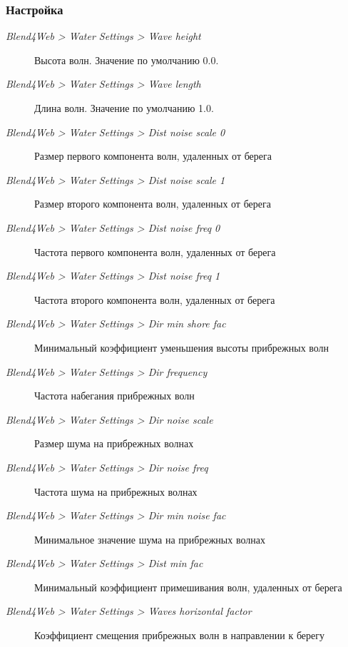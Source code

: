 \documentclass[a4paper,12pt,oneside]{sphinxmanual}
\begin{document}
\subsubsection{Настройка}
\label{outdoor_rendering:id22}\begin{description}
\item[{\emph{Blend4Web \textgreater{} Water Settings \textgreater{} Wave height}}] \leavevmode
Высота волн. Значение по умолчанию 0.0.

\item[{\emph{Blend4Web \textgreater{} Water Settings \textgreater{} Wave length}}] \leavevmode
Длина волн. Значение по умолчанию 1.0.

\item[{\emph{Blend4Web \textgreater{} Water Settings \textgreater{} Dist noise scale 0}}] \leavevmode
Размер первого компонента волн, удаленных от берега

\item[{\emph{Blend4Web \textgreater{} Water Settings \textgreater{} Dist noise scale 1}}] \leavevmode
Размер второго компонента волн, удаленных от берега

\item[{\emph{Blend4Web \textgreater{} Water Settings \textgreater{} Dist noise freq 0}}] \leavevmode
Частота первого компонента волн, удаленных от берега

\item[{\emph{Blend4Web \textgreater{} Water Settings \textgreater{} Dist noise freq 1}}] \leavevmode
Частота второго компонента волн, удаленных от берега

\item[{\emph{Blend4Web \textgreater{} Water Settings \textgreater{} Dir min shore fac}}] \leavevmode
Минимальный коэффициент уменьшения высоты прибрежных волн

\item[{\emph{Blend4Web \textgreater{} Water Settings \textgreater{} Dir frequency}}] \leavevmode
Частота набегания прибрежных волн

\item[{\emph{Blend4Web \textgreater{} Water Settings \textgreater{} Dir noise scale}}] \leavevmode
Размер шума на прибрежных волнах

\item[{\emph{Blend4Web \textgreater{} Water Settings \textgreater{} Dir noise freq}}] \leavevmode
Частота шума на прибрежных волнах

\item[{\emph{Blend4Web \textgreater{} Water Settings \textgreater{} Dir min noise fac}}] \leavevmode
Минимальное значение шума на прибрежных волнах

\item[{\emph{Blend4Web \textgreater{} Water Settings \textgreater{} Dist min fac}}] \leavevmode
Минимальный коэффициент примешивания волн, удаленных от берега

\item[{\emph{Blend4Web \textgreater{} Water Settings \textgreater{} Waves horizontal factor}}] \leavevmode
Коэффициент смещения прибрежных волн в направлении к берегу

\end{description}
\end{document}
